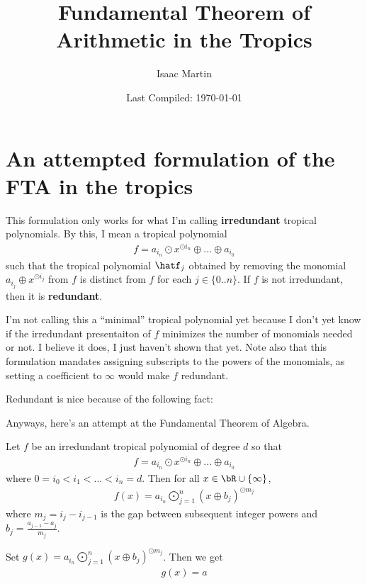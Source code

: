 
\usepackage{indentfirst}

\title{Fundamental Theorem of Arithmetic in the Tropics}
\date{Last Compiled: \today}
\author{Isaac Martin}


\pagestyle{empty}
\maketitle
\newpage

\section{An attempted formulation of the FTA in the tropics}
This formulation only works for what I'm calling \textbf{irredundant} tropical polynomials. By this, I mean a tropical polynomial
\begin{align*}
    f = a_{i_n}\odot x^{\odot i_n} \oplus ... \oplus a_{i_0}
\end{align*}
such that the tropical polynomial $\hatf_{j}$ obtained by removing the monomial $a_{i_j}\oplus x^{\odot i_j}$ from $f$ is distinct from $f$ for each $j \in \{0..n\}$. If $f$ is not irredundant, then it is \textbf{redundant}. 

I'm not calling this a ``minimal'' tropical polynomial yet because I don't yet know if the irredundant presentaiton of $f$ minimizes the number of monomials needed or not. I believe it does, I just haven't shown that yet. Note also that this formulation mandates assigning subscripts to the powers of the monomials, as setting a coefficient to $\infty$ would make $f$ redundant.

Redundant is nice because of the following fact:


Anyways, here's an attempt at the Fundamental Theorem of Algebra.
\begin{thm}\label{thm:fta}
  Let $f$ be an irredundant tropical polynomial of degree $d$ so that
  \begin{align*}
    f = a_{i_n}\odot x^{\odot i_n} \oplus ... \oplus a_{i_0}
  \end{align*}
  where $0 = i_0 < i_1 < ... < i_n = d$. Then for all $x \in \bR\cup \{\infty\}$,
  \begin{align*}
    f(x) = a_{i_n} \bigodot_{j = 1}^n (x\oplus b_j)^{\odot m_j}
  \end{align*}
  where $m_j = i_j - i_{j-1}$ is the gap between subsequent integer powers and $b_j = \frac{a_{j-1} - a_j}{m_j}$.
\end{thm}
\begin{prf}
  Set $g(x) = a_{i_n} \bigodot_{j = 1}^n (x\oplus b_j)^{\odot m_j}$. Then we get
  \begin{align*}
    g(x) = a
  \end{align*}
\end{prf}

